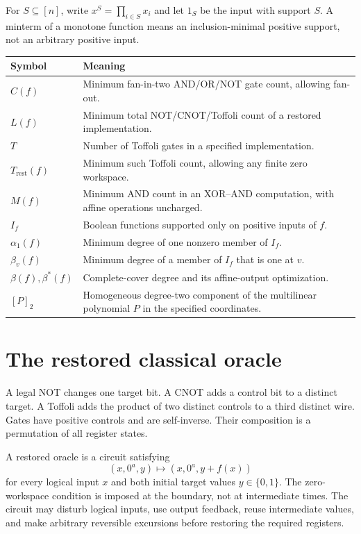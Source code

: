 \documentclass[11pt,letterpaper,oneside]{report}
\theoremstyle{komorebi}
\newcommand{\B}{\{0,1\}}
\newcommand{\KTrest}{T_{\mathrm{rest}}}
\begin{document}
For $S\subseteq[n]$, write $x^S=\prod_{i\in S}x_i$ and let $1_S$ be the input with support $S$. A minterm of a monotone function means an inclusion-minimal positive support, not an arbitrary positive input.

\begin{longtable}{@{}>{\RaggedRight\arraybackslash}p{1.1in}>{\RaggedRight\arraybackslash}p{5.0in}@{}}
\toprule
\textbf{Symbol} & \textbf{Meaning}\\\midrule\endhead
$C(f)$ & Minimum fan-in-two AND/OR/NOT gate count, allowing fan-out.\\
$L(f)$ & Minimum total NOT/CNOT/Toffoli count of a restored implementation.\\
$T$ & Number of Toffoli gates in a specified implementation.\\
$\KTrest(f)$ & Minimum such Toffoli count, allowing any finite zero workspace.\\
$M(f)$ & Minimum AND count in an XOR--AND computation, with affine operations uncharged.\\
$I_f$ & Boolean functions supported only on positive inputs of $f$.\\
$\alpha_1(f)$ & Minimum degree of one nonzero member of $I_f$.\\
$\beta_v(f)$ & Minimum degree of a member of $I_f$ that is one at $v$.\\
$\beta(f),\beta^*(f)$ & Complete-cover degree and its affine-output optimization.\\
$[P]_2$ & Homogeneous degree-two component of the multilinear polynomial $P$ in the specified coordinates.\\
\bottomrule
\end{longtable}

\section{The restored classical oracle}
A legal NOT changes one target bit. A CNOT adds a control bit to a distinct target. A Toffoli adds the product of two distinct controls to a third distinct wire. Gates have positive controls and are self-inverse. Their composition is a permutation of all register states.

A restored oracle is a circuit satisfying
\begin{equation}\label{eq:oracle}
(x,0^a,y)\longmapsto(x,0^a,y+f(x))
\end{equation}
for every logical input $x$ and both initial target values $y\in\B$. The zero-workspace condition is imposed at the boundary, not at intermediate times. The circuit may disturb logical inputs, use output feedback, reuse intermediate values, and make arbitrary reversible excursions before restoring the required registers.
\end{document}
